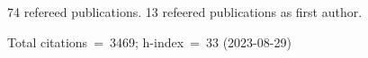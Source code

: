 74 refereed publications. 13 refeered publications as first author.

Total citations~=~3469; h-index~=~33 (2023-08-29)